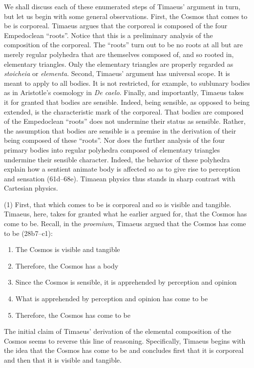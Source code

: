 We shall discuss each of these enumerated steps of Timaeus' argument in turn, but let us begin with some general observations. First, the Cosmos that comes to be is corporeal. Timaeus argues that the corporeal is composed of the four Empedoclean ``roots''. Notice that this is a preliminary analysis of the composition of the corporeal. The ``roots'' turn out to be no roots at all but are merely regular polyhedra that are themselves composed of, and so rooted in, elementary triangles. Only the elementary triangles are properly regarded as \emph{stoicheia} or \emph{elementa}. Second, Timaeus' argument has universal scope. It is meant to apply to all bodies. It is not restricted, for example, to sublunary bodies as in Aristotle's cosmology in \emph{De caelo}. Finally, and importantly, Timaeus takes it for granted that bodies are sensible. Indeed, being sensible, as opposed to being extended, is the characteristic mark of the corporeal. That bodies are composed of the Empedoclean ``roots'' does not undermine their status as sensible. Rather, the assumption that bodies are sensible is a premise in the derivation of their being composed of these ``roots''. Nor does the further analysis of the four primary bodies into regular polyhedra composed of elementary triangles undermine their sensible character. Indeed, the behavior of these polyhedra explain how a sentient animate body is affected so as to give rise to perception and sensation (61d--68e). Timaean physics thus stands in sharp contrast with Cartesian physics.

(1) First, that which comes to be is corporeal and so is visible and tangible. Timaeus, here, takes for granted what he earlier argued for, that the Cosmos has come to be. Recall, in the \emph{proemium}, Timaeus argued that the Cosmos has come to be (28b7--c1):
\begin{enumerate}[(1)]
	\item The Cosmos is visible and tangible
	\item Therefore, the Cosmos has a body
	\item Since the Cosmos is sensible, it is apprehended by perception and opinion
	\item What is apprehended by perception and opinion has come to be
	\item Therefore, the Cosmos has come to be
\end{enumerate}
The initial claim of Timaeus' derivation of the elemental composition of the Cosmos seems to reverse this line of reasoning. Specifically, Timaeus begins with the idea that the Cosmos has come to be and concludes first that it is corporeal and then that it is visible and tangible. 

